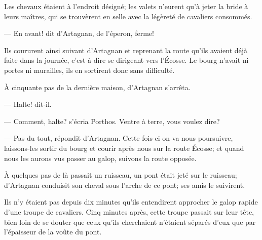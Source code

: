 Les chevaux étaient à l'endroit désigné; les valets n'eurent qu'à jeter la bride à leurs maîtres, qui se trouvèrent en selle avec la légèreté de cavaliers consommés.

— En avant! dit d'Artagnan, de l'éperon, ferme!

Ils coururent ainsi suivant d'Artagnan et reprenant la route qu'ils avaient déjà faite dans la journée, c'est-à-dire se dirigeant vers l'Écosse. Le bourg n'avait ni portes ni murailles, ils en sortirent donc sans difficulté.

À cinquante pas de la dernière maison, d'Artagnan s'arrêta.

— Halte! dit-il.

— Comment, halte? s'écria Porthos. Ventre à terre, vous voulez dire?

— Pas du tout, répondit d'Artagnan. Cette fois-ci on va nous poursuivre, laissons-les sortir du bourg et courir après nous sur la route Écosse; et quand nous les aurons vus passer au galop, suivons la route opposée.

À quelques pas de là passait un ruisseau, un pont était jeté sur le ruisseau; d'Artagnan conduisit son cheval sous l'arche de ce pont; ses amis le suivirent.

Ils n'y étaient pas depuis dix minutes qu'ils entendirent approcher le galop rapide d'une troupe de cavaliers. Cinq minutes après, cette troupe passait sur leur tête, bien loin de se douter que ceux qu'ils cherchaient n'étaient séparés d'eux que par l'épaisseur de la voûte du pont.